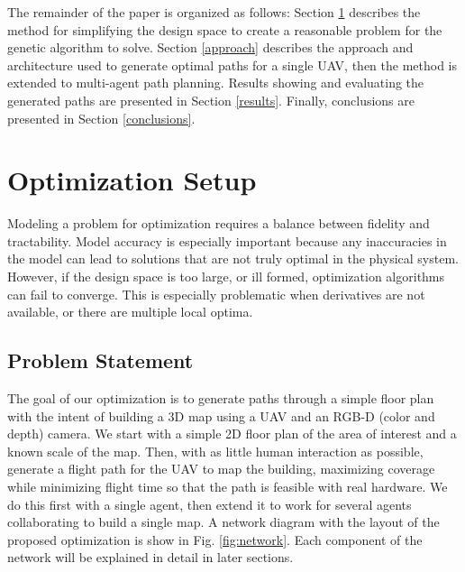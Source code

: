 \documentclass[letterpaper, 10 pt, conference]{ieeeconf}  %
\begin{document}
The remainder of the paper is organized as follows: Section \ref{setup} describes the method for simplifying the design space to create a reasonable problem for the genetic algorithm to solve. Section \ref{approach} describes the approach and architecture used to generate optimal paths for a single UAV, then the method is extended to multi-agent path planning.
Results showing and evaluating the generated paths are presented in Section \ref{results}. Finally, conclusions are presented in Section \ref{conclusions}.

\section{Optimization Setup}\label{setup}

Modeling a problem for optimization requires a balance between fidelity and tractability. Model accuracy is especially important because any inaccuracies in the model can lead to solutions that are not truly optimal in the physical system. However, if the design space is too large, or ill formed, optimization algorithms can fail to converge. This is especially problematic when derivatives are not available, or there are multiple local optima.

\subsection{Problem Statement}

The goal of our optimization is to generate paths through a simple floor plan with the intent of building a 3D map using a UAV and an RGB-D (color and depth) camera. We start with a simple 2D floor plan of the area of interest and a known scale of the map. Then, with as little human interaction as possible, generate a flight path for the UAV to map the building, maximizing coverage while minimizing flight time so that the path is feasible with real hardware. We do this first with a single agent, then extend it to work for several agents collaborating to build a single map. A network diagram with the layout of the proposed optimization is show in Fig. \ref{fig:network}. Each component of the network will be explained in detail in later sections.
\end{document}
